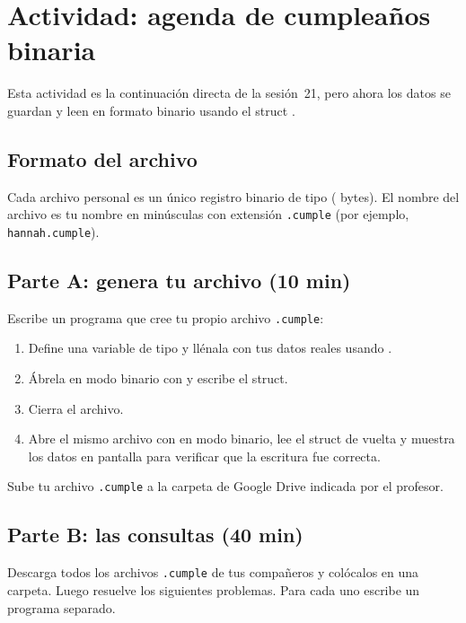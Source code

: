 \documentclass[12pt, oneside]{article}
\begin{document}
\section{Actividad: agenda de cumpleaños binaria}

Esta actividad es la continuación directa de la sesión~21, pero ahora
los datos se guardan y leen en formato binario usando el struct
.

\subsection{Formato del archivo}

Cada archivo personal es un único registro binario de tipo 
( bytes).  El nombre del archivo es tu nombre en
minúsculas con extensión \texttt{.cumple} (por ejemplo,
\texttt{hannah.cumple}).

\subsection{Parte A: genera tu archivo (10 min)}

Escribe un programa que cree tu propio archivo \texttt{.cumple}:

\begin{enumerate}
  \item Define una variable de tipo  y llénala con tus datos
        reales usando .
  \item Ábrela en modo binario con  y escribe el struct.
  \item Cierra el archivo.
  \item Abre el mismo archivo con  en modo binario, lee el
        struct de vuelta y muestra los datos en pantalla para verificar
        que la escritura fue correcta.
\end{enumerate}

Sube tu archivo \texttt{.cumple} a la carpeta de Google Drive indicada por
el profesor.

\subsection{Parte B: las consultas (40 min)}

Descarga todos los archivos \texttt{.cumple} de tus compañeros y
colócalos en una carpeta.  Luego resuelve los siguientes problemas.
Para cada uno escribe un programa separado.
\end{document}
